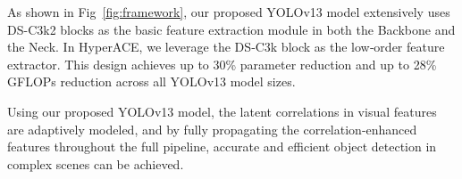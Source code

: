 As shown in Fig~\ref{fig:framework}, our proposed YOLOv13 model extensively uses DS-C3k2 blocks as the basic feature extraction module in both the Backbone and the Neck. In HyperACE, we leverage the DS‐C3k block as the low‐order feature extractor. This design achieves up to 30\% parameter reduction and up to 28\% GFLOPs reduction across all YOLOv13 model sizes.

Using our proposed YOLOv13 model, the latent correlations in visual features are adaptively modeled, and by fully propagating the correlation-enhanced features throughout the full pipeline, accurate and efficient object detection in complex scenes can be achieved.

